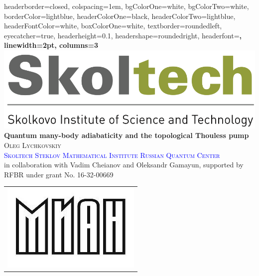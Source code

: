\documentclass[portratit,a0paper,fontscale=0.48]{baposter} %
\begin{document}
\begin{poster}
{
headerborder=closed, %
colspacing=1em, %
bgColorOne=white, %
bgColorTwo=white, %
borderColor=lightblue, %
headerColorOne=black, %
headerColorTwo=lightblue, %
headerFontColor=white, %
boxColorOne=white, %
textborder=roundedleft, %
eyecatcher=true, %
headerheight=0.1\textheight, %
headershape=roundedright, %
headerfont=\Large\bf\textsc, %
linewidth=2pt, %
columns=3
}
%
{\includegraphics[height=4 em]{skoltech_logo.png}} %
{
\bf{\LARGE Quantum many-body adiabaticity and the topological Thouless pump}
\vspace{0.4em}
} %
{\textsc{ \large Oleg Lychkovskiy  \\
\vspace{5 pt}
\textcolor{blue}{Skoltech}    \hspace{12pt} \textcolor{blue}{Steklov Mathematical Institute}  \hspace{12pt} \textcolor{blue}{Russian Quantum Center}
 }\\
 \vspace{3 pt}
{\small in collaboration with Vadim Cheianov and  Oleksandr Gamayun, supported by RFBR under grant No. 16-32-00669}} %
{
\begin{tabular}{c}
\includegraphics[height=4.5 em]{mianLogo.jpeg}
\end{tabular}
} %




\end{poster}
\end{document}
